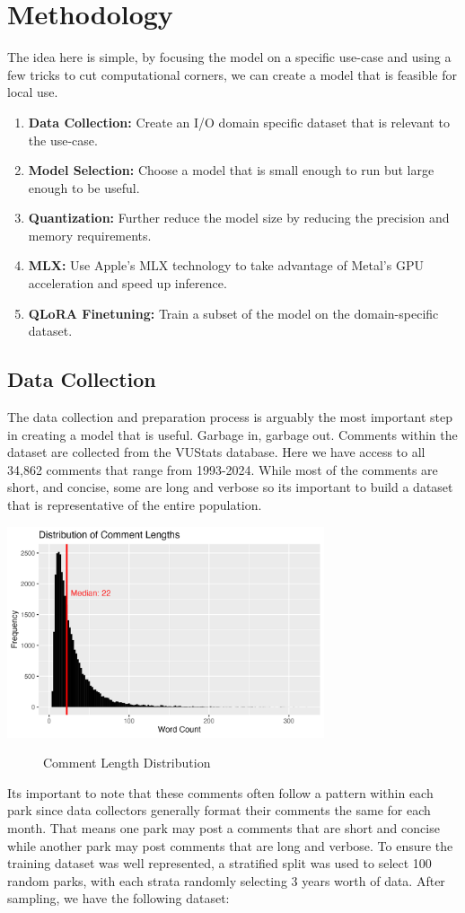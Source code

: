 \documentclass[12pt]{article}
\begin{document}
\section{Methodology}
The idea here is simple, by focusing the model on a specific use-case and using a few tricks to cut computational corners, we can create a model that is feasible for local use.
\begin{enumerate}
    \item \textbf{Data Collection:} Create an I/O domain specific dataset that is relevant to the use-case.
    \item \textbf{Model Selection:} Choose a model that is small enough to run but large enough to be useful.
    \item \textbf{Quantization:} Further reduce the model size by reducing the precision and memory requirements.
    \item \textbf{MLX:} Use Apple's MLX technology to take advantage of Metal's GPU acceleration and speed up inference.
    \item \textbf{QLoRA Finetuning:} Train a subset of the model on the domain-specific dataset.
\end{enumerate}

\subsection{Data Collection}
The data collection and preparation process is arguably the most important step in creating a model that is useful. Garbage in, garbage out.
Comments within the dataset are collected from the VUStats database. Here we have access to all 34,862 comments that range from 1993-2024. While most of the comments are short, and concise, some are long and verbose so its important to build a dataset that is representative of the entire population.
\begin{center}
    \includegraphics[width=0.7\textwidth]{../Visuals/AllCommentsHist.png}
    \begin{figure}
        \caption{Comment Length Distribution}
    \end{figure}
\end{center}
Its important to note that these comments often follow a pattern within each park since data collectors generally format their comments the same for each month. That means one park may post a comments that are short and concise while another park may post comments that are long and verbose. To ensure the training dataset was well represented, a stratified split was used to select 100 random parks, with each strata randomly selecting 3 years worth of data. After sampling, we have the following dataset:
\end{document}
